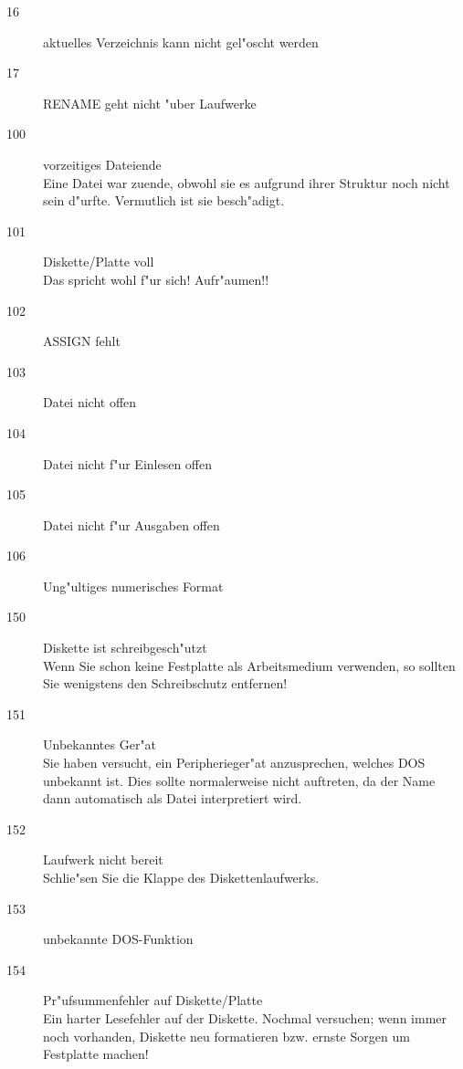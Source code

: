 \documentclass[12pt,a4paper,twoside]{report}
\begin{document}
\begin{description}
\item[16]{aktuelles Verzeichnis kann nicht gel"oscht werden}

\item[17]{RENAME geht nicht "uber Laufwerke}

\item[100]{vorzeitiges Dateiende\\
           Eine Datei war zuende, obwohl sie es aufgrund ihrer Struktur
           noch nicht sein d"urfte.  Vermutlich ist sie besch"adigt.}

\item[101]{Diskette/Platte voll\\
           Das spricht wohl f"ur sich!  Aufr"aumen!!}

\item[102]{ASSIGN fehlt}

\item[103]{Datei nicht offen}

\item[104]{Datei nicht f"ur Einlesen offen}

\item[105]{Datei nicht f"ur Ausgaben offen}

\item[106]{Ung"ultiges numerisches Format}

\item[150]{Diskette ist schreibgesch"utzt\\
           Wenn Sie schon keine Festplatte als Arbeitsmedium verwenden,
           so sollten Sie wenigstens den Schreibschutz entfernen!}

\item[151]{Unbekanntes Ger"at\\
           Sie haben versucht, ein Peripherieger"at anzusprechen, welches
           DOS unbekannt ist.  Dies sollte normalerweise nicht auftreten,
           da der Name dann automatisch als Datei interpretiert wird.}

\item[152]{Laufwerk nicht bereit\\
           Schlie"sen Sie die Klappe des Diskettenlaufwerks.}

\item[153]{unbekannte DOS-Funktion}

\item[154]{Pr"ufsummenfehler auf Diskette/Platte\\
           Ein harter Lesefehler auf der Diskette.  Nochmal versuchen; wenn
           immer noch vorhanden, Diskette neu formatieren bzw. ernste Sorgen
           um Festplatte machen!}


\end{description}
\end{document}

